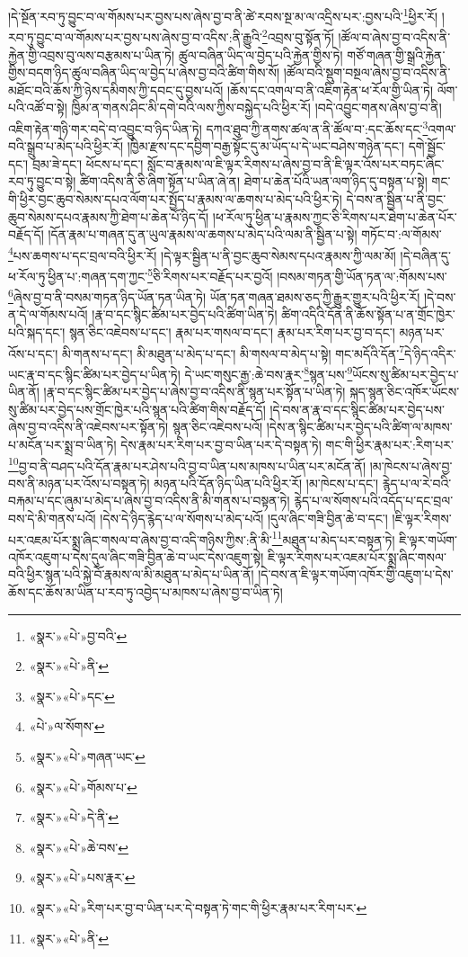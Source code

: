 །དེ་སྔོན་རབ་ཏུ་བྱུང་བ་ལ་གོམས་པར་བྱས་པས་ཞེས་བྱ་བ་ནི་ཚེ་རབས་སྔ་མ་ལ་འདྲིས་པར་:བྱས་པའི་\footnote{«སྣར་»«པེ་»བྱ་བའི་}ཕྱིར་རོ། །རབ་ཏུ་བྱུང་བ་ལ་གོམས་པར་བྱས་པས་ཞེས་བྱ་བ་འདིས་:ནི་རྒྱུའི་\footnote{«སྣར་»«པེ་»ནི་}འབྲས་བུ་སྟོན་ཏོ། །ཚོལ་བ་ཞེས་བྱ་བ་འདིས་ནི་རྐྱེན་གྱི་འབྲས་བུ་ལས་བརྩམས་པ་ཡིན་ཏེ། ཚུལ་བཞིན་ཡིད་ལ་བྱེད་པའི་རྐྱེན་གྱིས་ཏེ། གཙོ་གཞན་གྱི་སྒྲའི་རྐྱེན་གྱིས་བདག་ཉིད་ཚུལ་བཞིན་ཡིད་ལ་བྱེད་པ་ཞེས་བྱ་བའི་ཚིག་གིས་སོ། །ཚོལ་བའི་སྡུག་བསྔལ་ཞེས་བྱ་བ་འདིས་ནི་མཐོང་བའི་ཆོས་ཀྱི་ཉེས་དམིགས་ཀྱི་དབང་དུ་བྱས་པའོ། །ཆོས་དང་འགལ་བ་ནི་འཇིག་རྟེན་ཕ་རོལ་གྱི་ཡིན་ཏེ། ལོག་པའི་འཚོ་བ་སྟེ། ཁྱིམ་ན་གནས་ཤིང་མི་དགེ་བའི་ལས་ཀྱིས་བསྐྱེད་པའི་ཕྱིར་རོ། །བདེ་འབྱུང་གནས་ཞེས་བྱ་བ་ནི། འཇིག་རྟེན་གཉི་གར་བདེ་བ་འབྱུང་བ་ཉིད་ཡིན་ཏེ། དཀའ་ཐུབ་ཀྱི་ནགས་ཚལ་ན་ནི་ཚོལ་བ་:དང་ཆོས་དང་\footnote{«སྣར་»«པེ་»དང་}འགལ་བའི་སྒྲུབ་པ་མེད་པའི་ཕྱིར་རོ། །ཁྱིམ་རྫས་དང་དབྱིག་བརྒྱ་སྟོང་དུ་མ་ཡོད་པ་དེ་ཡང་བཤེས་གཉེན་དང་། དགེ་སྦྱོང་དང་། བྲམ་ཟེ་དང་། ཕོངས་པ་དང་། སློང་བ་རྣམས་ལ་ཇི་ལྟར་རིགས་པ་ཞེས་བྱ་བ་ནི་ཇི་ལྟར་འོས་པར་བཏང་ཞིང་རབ་ཏུ་བྱུང་བ་སྟེ། ཚིག་འདིས་ནི་ཅི་ཞིག་སྟོན་པ་ཡིན་ཞེ་ན། ཐེག་པ་ཆེན་པོའི་ཡན་ལག་ཉིད་དུ་བསྟན་པ་སྟེ། གང་གི་ཕྱིར་བྱང་ཆུབ་སེམས་དཔའ་ལོག་པར་སྤྱོད་པ་རྣམས་ལ་ཆགས་པ་མེད་པའི་ཕྱིར་ཏེ། དེ་བས་ན་སྦྱིན་པ་ནི་བྱང་ཆུབ་སེམས་དཔའ་རྣམས་ཀྱི་ཐེག་པ་ཆེན་པོ་ཉིད་དོ། །ཕ་རོལ་ཏུ་ཕྱིན་པ་རྣམས་ཀྱང་ཅི་རིགས་པར་ཐེག་པ་ཆེན་པོར་བརྗོད་དོ། །དོན་རྣམ་པ་གཞན་དུ་ན་ཡུལ་རྣམས་ལ་ཆགས་པ་མེད་པའི་ལམ་ནི་སྦྱིན་པ་སྟེ། གཏོང་བ་:ལ་གོམས་\footnote{«པེ་»ལ་སོགས་}པས་ཆགས་པ་དང་བྲལ་བའི་ཕྱིར་རོ། །དེ་ལྟར་སྦྱིན་པ་ནི་བྱང་ཆུབ་སེམས་དཔའ་རྣམས་ཀྱི་ལམ་མོ། །དེ་བཞིན་དུ་ཕ་རོལ་ཏུ་ཕྱིན་པ་:གཞན་དག་ཀྱང་\footnote{«སྣར་»«པེ་»གཞན་ཡང་}ཅི་རིགས་པར་བརྗོད་པར་བྱའོ། །བསམ་གཏན་གྱི་ཡོན་ཏན་ལ་:གོམས་པས་\footnote{«སྣར་»«པེ་»གོམས་པ་}ཞེས་བྱ་བ་ནི་བསམ་གཏན་ཉིད་ཡོན་ཏན་ཡིན་ཏེ། ཡོན་ཏན་གཞན་ཐམས་ཅད་ཀྱི་རྒྱུར་གྱུར་པའི་ཕྱིར་རོ། །དེ་བས་ན་དེ་ལ་གོམས་པའོ། །རྣ་བ་དང་སྙིང་ཚིམ་པར་བྱེད་པའི་ཚིག་ཡིན་ཏེ། ཚིག་འདིའི་དོན་ནི་ཆོས་སྟོན་པ་ན་གྲོང་ཁྱེར་པའི་སྐད་དང་། སྙན་ཅིང་འཇེབས་པ་དང་། རྣམ་པར་གསལ་བ་དང་། རྣམ་པར་རིག་པར་བྱ་བ་དང་། མཉན་པར་འོས་པ་དང་། མི་གནས་པ་དང་། མི་མཐུན་པ་མེད་པ་དང་། མི་གསལ་བ་མེད་པ་སྟེ། གང་མདོའི་དོན་\footnote{«སྣར་»«པེ་»དེ་ནི་}དེ་ཉིད་འདིར་ཡང་རྣ་བ་དང་སྙིང་ཚིམ་པར་བྱེད་པ་ཡིན་ཏེ། དེ་ཡང་གསུང་རྒྱ་:ཆེ་བས་རྣར་\footnote{«སྣར་»«པེ་»ཆེ་བས་}སྙན་པས་\footnote{«སྣར་»«པེ་»པས་རྣར་}ཡོངས་སུ་ཚིམ་པར་བྱེད་པ་ཡིན་ནོ། །རྣ་བ་དང་སྙིང་ཚིམ་པར་བྱེད་པ་ཞེས་བྱ་བ་འདིས་ནི་སྙན་པར་སྟོན་པ་ཡིན་ཏེ། སྐད་སྙན་ཅིང་འཁོར་ཡོངས་སུ་ཚིམ་པར་བྱེད་པས་གྲོང་ཁྱེར་པའི་སྙན་པའི་ཚིག་གིས་བརྗོད་དོ། །དེ་བས་ན་རྣ་བ་དང་སྙིང་ཚིམ་པར་བྱེད་པས་ཞེས་བྱ་བ་འདིས་ནི་འཇེབས་པར་སྟོན་ཏེ། སྙན་ཅིང་འཇེབས་པའོ། །དེས་ན་སྙིང་ཚིམ་པར་བྱེད་པའི་ཚིག་ལ་མཁས་པ་མངོན་པར་སྨྲ་བ་ཡིན་ཏེ། དེས་རྣམ་པར་རིག་པར་བྱ་བ་ཡིན་པར་དེ་བསྟན་ཏེ། གང་གི་ཕྱིར་རྣམ་པར་:རིག་པར་\footnote{«སྣར་»«པེ་»རིག་པར་བྱ་བ་ཡིན་པར་དེ་བསྟན་ཏེ་གང་གི་ཕྱིར་རྣམ་པར་རིག་པར་}བྱ་བ་ནི་བཤད་པའི་དོན་རྣམ་པར་ཤེས་པའི་བྱ་བ་ཡིན་པས་མཁས་པ་ཡིན་པར་མངོན་ནོ། །མ་ཁེངས་པ་ཞེས་བྱ་བས་ནི་མཉན་པར་འོས་པ་བསྟན་ཏེ། མཉན་པའི་དོན་ཉིད་ཡིན་པའི་ཕྱིར་རོ། །མ་ཁེངས་པ་དང་། རྙེད་པ་ལ་རེ་བའི་བརྐམ་པ་དང་ཞུམ་པ་མེད་པ་ཞེས་བྱ་བ་འདིས་ནི་མི་གནས་པ་བསྟན་ཏེ། རྙེད་པ་ལ་སོགས་པའི་འདོད་པ་དང་བྲལ་བས་དེ་མི་གནས་པའོ། །དེས་དེ་ཉིད་རྙེད་པ་ལ་སོགས་པ་མེད་པའོ། །དུལ་ཞིང་གཟི་བྱིན་ཆེ་བ་དང་། །ཇི་ལྟར་རིགས་པར་འཇམ་པོར་སྨྲ་ཞིང་གསལ་བ་ཞེས་བྱ་བ་འདི་གཉིས་ཀྱིས་:ནི་མི་\footnote{«སྣར་»«པེ་»ནི་}མཐུན་པ་མེད་པར་བསྟན་ཏེ། ཇི་ལྟར་གཡོག་འཁོར་འཇུག་པ་དེས་དུལ་ཞིང་གཟི་བྱིན་ཆེ་བ་ཡང་དེས་འཇུག་སྟེ། ཇི་ལྟར་རིགས་པར་འཇམ་པོར་སྨྲ་ཞིང་གསལ་བའི་ཕྱིར་སྙན་པའི་སྐྱེ་བོ་རྣམས་ལ་མི་མཐུན་པ་མེད་པ་ཡིན་ནོ། །དེ་བས་ན་ཇི་ལྟར་གཡོག་འཁོར་གྱི་འཇུག་པ་དེས་ཆོས་དང་ཆོས་མ་ཡིན་པ་རབ་ཏུ་འབྱེད་པ་མཁས་པ་ཞེས་བྱ་བ་ཡིན་ཏེ། 